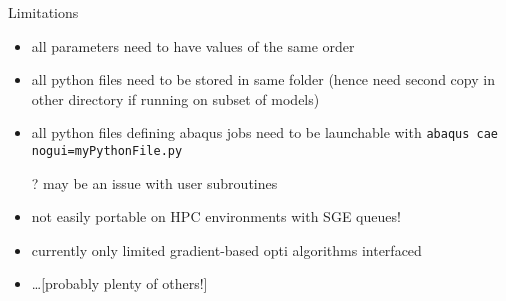 \begin{frame}{Limitations}

\begin{itemize}
\item all parameters need to have values of the same order
\item all python files need to be stored in same folder (hence need second copy in other directory if running on subset of models)
\item all python files defining abaqus jobs need to be launchable with
  \texttt{abaqus cae nogui=myPythonFile.py}
  
  ? may be an issue with user subroutines
\item not easily portable on HPC environments with SGE queues!
\item currently only limited gradient-based opti algorithms interfaced
\item \dots [probably plenty of others!]
\end{itemize}

\end{frame}
